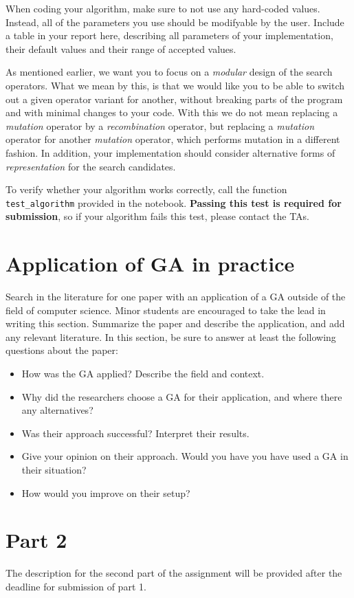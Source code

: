 \documentclass[runningheads]{llncs}
\begin{document}
When coding your algorithm, make sure to not use any hard-coded values. Instead, all of the parameters you use should be modifyable by the user. Include a table in your report here, describing all parameters of your implementation, their default values and their range of accepted values. 

As mentioned earlier, we want you to focus on a \emph{modular} design of the search operators. What we mean by this, is that we would like you to be able to switch out a given operator variant for another, without breaking parts of the program and with minimal changes to your code. With this we do not mean replacing a \emph{mutation} operator by a \emph{recombination} operator, but replacing a \emph{mutation} operator for another \emph{mutation} operator, which performs mutation in a different fashion. In addition, your implementation should consider alternative forms of \emph{representation} for the search candidates. 

To verify whether your algorithm works correctly, call the function \verb!test_algorithm! provided in the notebook. \textbf{Passing this test is required for submission}, so if your algorithm fails this test, please contact the TAs. 


\section{Application of GA in practice}
Search in the literature for one paper with an application of a GA outside of the field of computer science. Minor students are encouraged to take the lead in writing this section. Summarize the paper and describe the application, and add any relevant literature. In this section, be sure to answer at least the following questions about the paper: 
\begin{itemize}
    \item How was the GA applied? Describe the field and context.
    \item Why did the researchers choose a GA for their application, and where there any alternatives?
    \item Was their approach successful? Interpret their results.
    \item Give your opinion on their approach. Would you have you have used a GA in their situation?
    \item How would you improve on their setup? 
\end{itemize}

\section{Part 2}
The description for the second part of the assignment will be provided after the deadline for submission of part 1.
\end{document}
